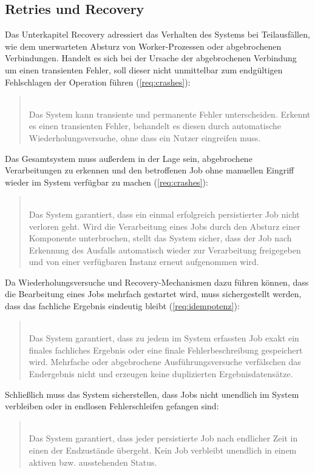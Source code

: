 \subsection{Retries und Recovery}
\label{subsec:anforderungen_recovery}
Das Unterkapitel Recovery adressiert das Verhalten des Systems bei Teilausfällen, wie dem unerwarteten Absturz von Worker-Prozessen
oder abgebrochenen Verbindungen.
Handelt es sich bei der Ursache der abgebrochenen Verbindung um einen transienten Fehler, soll dieser nicht unmittelbar zum
endgültigen Fehlschlagen der Operation führen (\ref{req:crashes}):
\begin{quote}
     \\
    Das System kann transiente und permanente Fehler unterscheiden.
    Erkennt es einen transienten Fehler, behandelt es diesen durch automatische Wiederholungsversuche, ohne dass ein Nutzer
    eingreifen muss.
\end{quote}
Das Gesamtsystem muss außerdem in der Lage sein, abgebrochene Verarbeitungen zu erkennen und den betroffenen Job ohne manuellen Eingriff
wieder im System verfügbar zu machen (\ref{req:crashes}):
\begin{quote}
     \\
    Das System garantiert, dass ein einmal erfolgreich persistierter Job nicht verloren geht.
    Wird die Verarbeitung eines Jobs durch den Absturz einer Komponente unterbrochen,
    stellt das System sicher, dass der Job nach Erkennung des Ausfalls automatisch wieder zur Verarbeitung freigegeben und von einer
    verfügbaren Instanz erneut aufgenommen wird.
\end{quote}
Da Wiederholungsversuche und Recovery-Mechanismen dazu führen können, dass die Bearbeitung eines Jobs mehrfach
gestartet wird, muss sichergestellt werden, dass das fachliche Ergebnis eindeutig bleibt (\ref{req:idempotenz}):
\begin{quote}
     \\
    Das System garantiert, dass zu jedem im System erfassten Job exakt ein finales fachliches Ergebnis oder eine finale
    Fehlerbeschreibung gespeichert wird.
    Mehrfache oder abgebrochene Ausführungsversuche verfälschen das Endergebnis nicht und erzeugen keine duplizierten Ergebnisdatensätze.
\end{quote}
Schließlich muss das System sicherstellen, dass Jobs nicht unendlich im System verbleiben oder in endlosen Fehlerschleifen gefangen sind:
\begin{quote}
     \\
    Das System garantiert, dass jeder persistierte Job nach endlicher Zeit in einen der Endzustände übergeht.
    Kein Job verbleibt unendlich in einem aktiven bzw. ausstehenden Status.
\end{quote}

